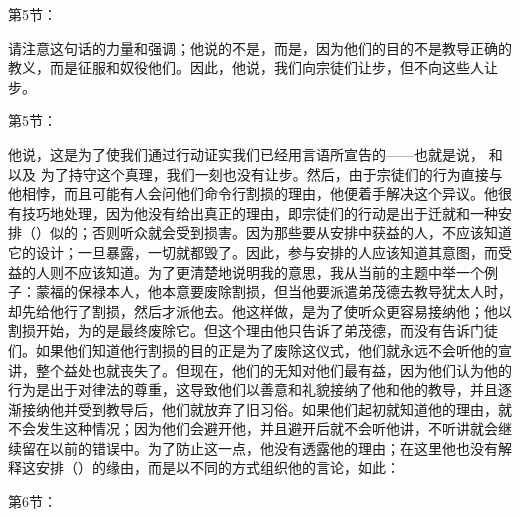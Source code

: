 第5节： \par

请注意这句话的力量和强调；他说的不是，而是，因为他们的目的不是教导正确的教义，而是征服和奴役他们。因此，他说，我们向宗徒们让步，但不向这些人让步。\par

第5节： \par

他说，这是为了使我们通过行动证实我们已经用言语所宣告的——也就是说， 和   以及   为了持守这个真理，我们一刻也没有让步。然后，由于宗徒们的行为直接与他相悖，而且可能有人会问他们命令行割损的理由，他便着手解决这个异议。他很有技巧地处理，因为他没有给出真正的理由，即宗徒们的行动是出于迁就和一种安排（）似的；否则听众就会受到损害。因为那些要从安排中获益的人，不应该知道它的设计；一旦暴露，一切就都毁了。因此，参与安排的人应该知道其意图，而受益的人则不应该知道。为了更清楚地说明我的意思，我从当前的主题中举一个例子：蒙福的保禄本人，他本意要废除割损，但当他要派遣弟茂德去教导犹太人时，却先给他行了割损，然后才派他去。他这样做，是为了使听众更容易接纳他；他以割损开始，为的是最终废除它。但这个理由他只告诉了弟茂德，而没有告诉门徒们。如果他们知道他行割损的目的正是为了废除这仪式，他们就永远不会听他的宣讲，整个益处也就丧失了。但现在，他们的无知对他们最有益，因为他们认为他的行为是出于对律法的尊重，这导致他们以善意和礼貌接纳了他和他的教导，并且逐渐接纳他并受到教导后，他们就放弃了旧习俗。如果他们起初就知道他的理由，就不会发生这种情况；因为他们会避开他，并且避开后就不会听他讲，不听讲就会继续留在以前的错误中。为了防止这一点，他没有透露他的理由；在这里他也没有解释这安排（）的缘由，而是以不同的方式组织他的言论，如此：\par

第6节： \par

